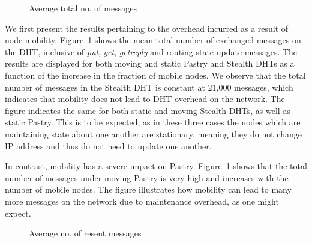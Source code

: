 \documentclass[times, 10pt,twocolumn]{article}
\begin{document}


\begin{figure}[tbp]
\centering {}
\caption{Average total no. of messages} \label{fig:msg}
\end{figure}

We first present the results pertaining to the overhead incurred as
a result of node mobility. Figure~\ref{fig:msg} shows the mean total
number of exchanged messages on the DHT, inclusive of {\em put},
{\em get}, {\em getreply} and routing state update messages. The
results are displayed for both moving and static Pastry and Stealth
DHTs as a function of the increase in the fraction of mobile nodes.
We observe that the total number of messages in the Stealth DHT is
constant at 21,000 messages, which indicates that mobility does not
lead to DHT overhead on the network. The figure indicates the same
for both static and moving Stealth DHTs, as well as static Pastry.
This is to be expected, as in these three cases the nodes which are
maintaining state about one another are stationary, meaning they do
not change IP address and thus do not need to update one another.

In contrast, mobility has a severe impact on Pastry.
Figure~\ref{fig:msg} shows that the total number of messages under
moving Pastry is very high and increases with the number of mobile
nodes. The figure illustrates how mobility can lead to many more
messages on the network due to maintenance overhead, as one might
expect.


\begin{figure}[tbp]
\centering {}
\caption{Average no. of resent messages} \label{fig:rsnt}
\end{figure}
\end{document}
